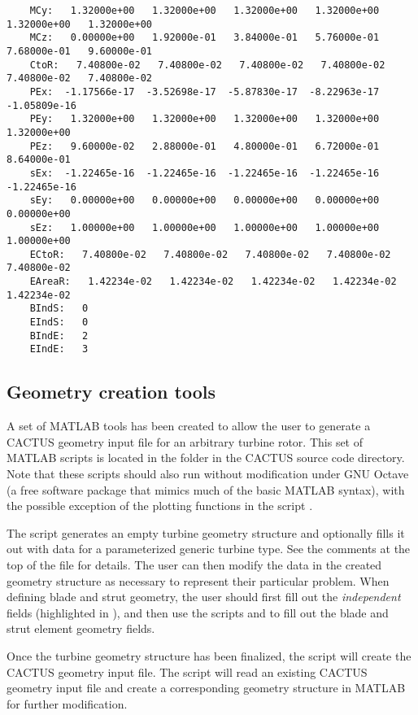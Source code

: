 \begin{lstlisting}
    MCy:   1.32000e+00   1.32000e+00   1.32000e+00   1.32000e+00   1.32000e+00   1.32000e+00 
    MCz:   0.00000e+00   1.92000e-01   3.84000e-01   5.76000e-01   7.68000e-01   9.60000e-01 
    CtoR:   7.40800e-02   7.40800e-02   7.40800e-02   7.40800e-02   7.40800e-02   7.40800e-02 
    PEx:  -1.17566e-17  -3.52698e-17  -5.87830e-17  -8.22963e-17  -1.05809e-16 
    PEy:   1.32000e+00   1.32000e+00   1.32000e+00   1.32000e+00   1.32000e+00 
    PEz:   9.60000e-02   2.88000e-01   4.80000e-01   6.72000e-01   8.64000e-01 
    sEx:  -1.22465e-16  -1.22465e-16  -1.22465e-16  -1.22465e-16  -1.22465e-16 
    sEy:   0.00000e+00   0.00000e+00   0.00000e+00   0.00000e+00   0.00000e+00 
    sEz:   1.00000e+00   1.00000e+00   1.00000e+00   1.00000e+00   1.00000e+00 
    ECtoR:   7.40800e-02   7.40800e-02   7.40800e-02   7.40800e-02   7.40800e-02 
    EAreaR:   1.42234e-02   1.42234e-02   1.42234e-02   1.42234e-02   1.42234e-02 
    BIndS:   0 
    EIndS:   0 
    BIndE:   2 
    EIndE:   3
\end{lstlisting}

\subsection{Geometry creation tools}
\label{sec:geomery_creation_tools}
A set of MATLAB tools has been created to allow the user to generate a CACTUS geometry input file for an arbitrary turbine rotor. This set of MATLAB scripts is located in the  folder in the CACTUS source code directory. Note that these scripts should also run without modification under GNU Octave (a free software package that mimics much of the basic MATLAB syntax), with the possible exception of the plotting functions in the script .

The script  generates an empty turbine geometry structure and optionally fills it out with data for a parameterized generic turbine type. See the comments at the top of the file for details. The user can then modify the data in the created geometry structure as necessary to represent their particular problem. When defining blade and strut geometry, the user should first fill out the \emph{independent} fields (highlighted in ), and then use the scripts  and  to fill out the blade and strut element geometry fields.

Once the turbine geometry structure has been finalized, the script  will create the CACTUS geometry input file. The script  will read an existing CACTUS geometry input file and create a corresponding geometry structure in MATLAB for further modification.

